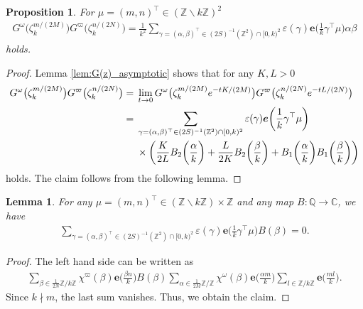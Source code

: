 \documentclass[11pt]{article}
\numberwithin{equation}{section}
\newcommand{\veps}{\varepsilon}
\newcommand{\Z}{\mathbb{Z}}
\newcommand{\Q}{\mathbb{Q}}
\newcommand{\bbC}{\mathbb{C}}
\numberwithin{equation}{section}
\newtheorem{lem}[Theorem]{Lemma}
\newtheorem{prop}[Theorem]{Proposition}
 { \theoremstyle{definition}
\newtheorem{dfn}[Theorem]{Definition}
\newtheorem{Note}[Theorem]{Note}
\newtheorem{ex}[Theorem]{Example}
\newtheorem{rem}[Theorem]{Remark}
\newtheorem{assump}[Theorem]{Assumption}
}
\newcommand{\trans}[1]{#1^\top}
\begin{document}
\begin{prop} \label{prop:G(z)_value}
	For $ \mu = \trans{(m, n)} \in (\Z \smallsetminus k\Z)^2 $
	\begin{gather*}
	G^\omega\big(\zeta_k^{m/(2M)}\big) G^\varpi\big(\zeta_k^{n/(2N)}\big)
	= \frac{1}{k^2} \sum_{ \gamma = \trans{(\alpha, \beta)} \in (2S)^{-1}(\Z^2) \cap [0, k)^2}
	\veps(\gamma) \bm{e}\bigg( \frac{1}{k} \trans{\gamma} \mu \bigg) \alpha \beta
	\end{gather*}
	holds.
\end{prop}
\begin{proof}
	Lemma \ref{lem:G(z)_asymptotic} shows that for any $ K, L > 0 $
	\begin{align*}
		G^\omega\big(\zeta_k^{m/(2M)}\big) G^\varpi\big(\zeta_k^{n/(2N)}\big)
	= {}&\lim_{t \to 0} G^\omega\big(\zeta_k^{m/(2M)} {\rm e}^{-tK/(2M)}\big) G^\varpi\big(\zeta_k^{n/(2N)} {\rm e}^{-tL/(2N)}\big)
\\
		= {}&\sum_{\gamma = \trans{(\alpha, \beta)} \in (2S)^{-1}(\Z^2) \cap [0, k)^2} \veps(\gamma) \bm{e}\bigg(\frac{1}{k} \trans{\gamma} \mu \bigg)
\\
	&\times	\bigg(
		\frac{K}{2L} B_2 \bigg( \frac{\alpha}{k} \bigg)
		+ \frac{L}{2K} B_2 \bigg( \frac{\beta}{k} \bigg)
		+ B_1 \bigg( \frac{\alpha}{k} \bigg) B_1 \bigg( \frac{\beta}{k} \bigg)
		\bigg)
	\end{align*}
	holds.
	The claim follows from the following lemma.
\end{proof}
\begin{lem} %
	For any $ \mu = \trans{(m, n)} \in (\Z \smallsetminus k\Z) \times \Z $ and any map $ B \colon \Q \to \bbC $, we have
	\begin{gather*}
	\sum_{\gamma = \trans{(\alpha, \beta)} \in (2S)^{-1}(\Z^2) \cap [0, k)^2}
	\veps(\gamma) \bm{e}\bigg( \frac{1}{k} \trans{\gamma} \mu \bigg) B (\beta)
	= 0.
	\end{gather*}
\end{lem}
\begin{proof}
	The left hand side can be written as
	\begin{gather*}
	\sum_{\beta \in \frac{1}{2N}\Z/k\Z} \chi^\varpi(\beta) \bm{e}\bigg( \frac{\beta n}{k} \bigg) B (\beta)
	\sum_{\alpha \in \frac{1}{2M}\Z/\Z} \chi^\omega(\beta) \bm{e}\bigg( \frac{\alpha m}{k} \bigg)
	\sum_{l \in \Z/k\Z} \bm{e}\bigg( \frac{ml}{k} \bigg).
	\end{gather*}
	Since $ k \nmid m $, the last sum vanishes.
	Thus, we obtain the claim.
\end{proof}
\end{document}

